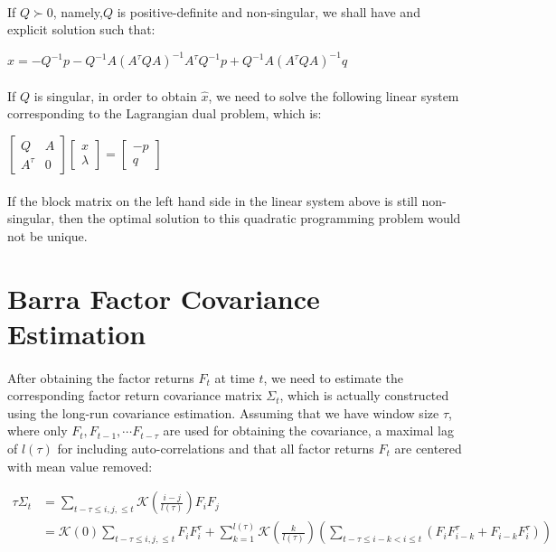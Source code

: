 \documentclass{article}
\begin{document}
\paragraph{}If $Q \succ 0$, namely,$Q$ is positive-definite and non-singular, we shall have and explicit solution such that:
\begin{center}
    $\hat{x} = -Q^{-1}p-Q^{-1}A(A^{\tau}QA)^{-1}A^{\tau}Q^{-1}p+Q^{-1}A(A^{\tau}QA)^{-1}q$
\end{center}
\paragraph{}If $Q$ is singular, in order to obtain $\hat{x}$, we need to solve the following linear system corresponding to the Lagrangian dual problem, which is:
\begin{center}
    $
  \left[
  \begin{array}{cc}
     Q  & A \\
      A^{\tau} & 0  
  \end{array}
  \right]
  \left[
  \begin{array}{c}
       x \\
       \lambda 
  \end{array}
  \right] =
  \left[
  \begin{array}{c}
       -p  \\
       q
  \end{array}
  \right]
    $
\end{center}
\paragraph{}If the block matrix on the left hand side in the linear system above is still non-singular, then the optimal solution to this quadratic programming problem would not be unique.
\section{Barra Factor Covariance Estimation}
\paragraph{}After obtaining the factor returns $F_{t}$ at time $t$, we need to estimate the corresponding factor return covariance matrix $\Sigma_{t}$, which is actually constructed using the long-run covariance estimation. Assuming that we have window size $\tau$, where only $F_{t}, F_{t-1}, \cdots F_{t-\tau}$ are used for obtaining the covariance, a maximal lag of $l(\tau)$ for including auto-correlations and that all factor returns $F_{t}$ are centered with mean value removed:
\begin{center}
    $
    \begin{aligned}
    \tau\Sigma_{t} &= \sum\limits_{t-\tau \leq i,j, \leq t} \mathcal{K}(\frac{i-j}{l(\tau)}) F_{i}F_{j} \\
    &=  \mathcal{K}(0) \sum\limits_{t-\tau \leq i,j, \leq t} F_{i}F_{i}^{\tau} +
    \sum\limits_{k=1}^{l(\tau)} \mathcal{K}(\frac{k}{l(\tau)})(\sum\limits_{t-\tau \leq i-k < i \leq t}(F_{i}F_{i-k}^{\tau}+F_{i-k}F_{i}^{\tau}))
    \end{aligned}
    $
\end{center}
\end{document}
